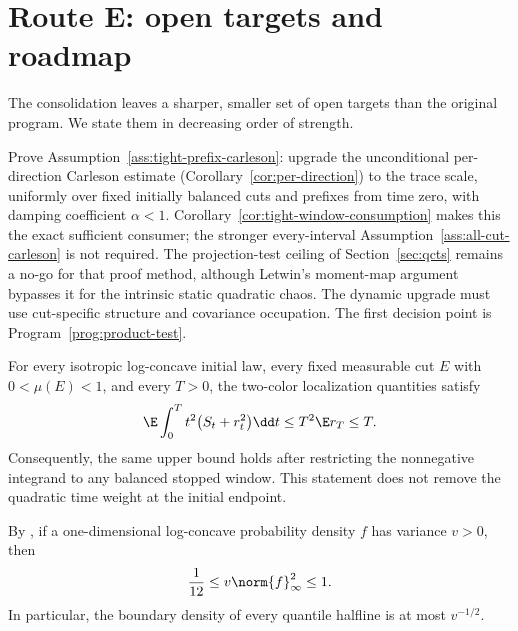\documentclass[../../main.tex]{subfiles}
\begin{document}
\section{Route E: open targets and roadmap}
\label{sec:open}

The consolidation leaves a sharper, smaller set of open targets than the original program. We
state them in decreasing order of strength.

\begin{question}
\label{q:upgrade}
Prove Assumption~\ref{ass:tight-prefix-carleson}: upgrade the unconditional per-direction
Carleson estimate (Corollary~\ref{cor:per-direction}) to the trace scale, uniformly over fixed
initially balanced cuts and prefixes from time zero, with damping coefficient $\alpha<1$.
Corollary~\ref{cor:tight-window-consumption} makes this the exact sufficient consumer; the
stronger every-interval Assumption~\ref{ass:all-cut-carleson} is not required. The projection-test
ceiling of Section~\ref{sec:qcts} remains a no-go for that proof method, although Letwin's
moment-map argument bypasses it for the intrinsic static quadratic chaos. The dynamic upgrade
must use cut-specific structure and covariance occupation. The first decision point is
Program~\ref{prog:product-test}.
\end{question}

\begin{lemma}
\label{lem:time-weighted-source}
For every isotropic log-concave initial law, every fixed measurable cut $E$ with
$0<\mu(E)<1$, and every $T>0$, the two-color localization quantities satisfy
\begin{equation}
  \E\int_0^T t^2\bigl(S_t+r_t^2\bigr)\dd t
  \le T^2\E r_T\le T.
  \label{eq:time-weighted-source}
\end{equation}
Consequently, the same upper bound holds after restricting the nonnegative integrand to any
balanced stopped window. This statement does not remove the quadratic time weight at the
initial endpoint.
\end{lemma}

\begin{lemma}
\label{lem:one-dimensional-density-variance}
By \cite[Prop.~2.1]{BobkovChistyakov2015Concentration}, if a one-dimensional log-concave
probability density $f$ has variance $v>0$, then
\[
  \frac1{12}\le v\norm{f}_\infty^2\le1.
\]
In particular, the boundary density of every quantile halfline is at most $v^{-1/2}$.
\end{lemma}
\end{document}

